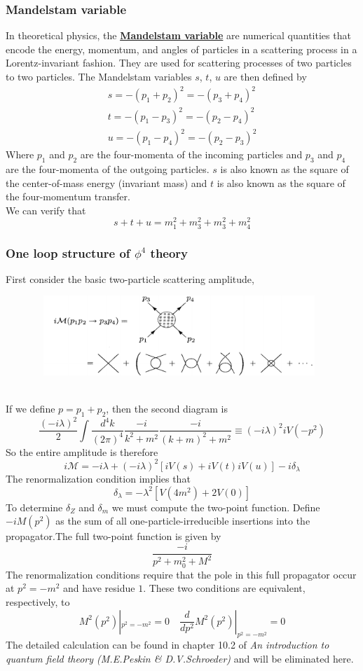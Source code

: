 \documentclass{article}
\begin{document}
\subsubsection{Mandelstam variable}
In theoretical physics, the \href{https://en.wikipedia.org/wiki/Mandelstam_variables}{\textbf{Mandelstam variable}}  are numerical quantities that encode the energy, momentum, and angles of particles in a scattering process in a Lorentz-invariant fashion. They are used for scattering processes of two particles to two particles. 
The Mandelstam variables $s$, $t$, $u$ are then defined by
\begin{eqnarray}
s=-(p_{1}+p_{2})^{2}=-(p_{3}+p_{4})^{2} \nonumber \\
t=-(p_{1}-p_{3})^{2}=-(p_{2}-p_{4})^{2} \nonumber \\
u=-(p_{1}-p_{4})^{2}=-(p_{2}-p_{3})^{2} \nonumber
\end{eqnarray}
Where $p_1$ and $p_2$ are the four-momenta of the incoming particles and $p_3$ and $p_4$ are the four-momenta of the outgoing particles.
$s$ is also known as the square of the center-of-mass energy (invariant mass) and $t$ is also known as the square of the four-momentum transfer.\\
We can verify that
\[s+t+u = m_1^2 + m_3^2 + m_3^2 +m_4^2\]

\subsubsection{One loop structure of $\phi^4$ theory}
First consider the basic two-particle scattering amplitude,
\begin{figure}[!h]
\centering
\includegraphics[height=3cm ,width=11cm]{./pic/RG4.png}
\caption*{}
\end{figure}\\
If we define $p = p_1 + p_2$, then the second diagram is
\[\frac{(-i\lambda)^2}{2} \int \frac{d^4k}{(2\pi)^4} \frac{-i}{k^2+m^2} \frac{-i}{(k+m)^2+m^2} \equiv (-i\lambda)^2 iV(-p^2)\]
So the entire amplitude is therefore
\[i\mathcal{M} = -i\lambda + (-i\lambda)^2 [iV(s) + iV(t) iV(u)] -i\delta_{\lambda}\]
The renormalization condition implies that
\[\delta_{\lambda} = -\lambda^2[V(4m^2)+2V(0)]\]
To determine $\delta_Z$ and $\delta_m$ we must compute the two-point function. Define $-iM(p^2)$ as the sum of all one-particle-irreducible insertions into the propagator.The full two-point function is given by
\[\frac{-i}{p^2 + m_0^2 + M^2}\]
The renormalization conditions require that the pole in this full propagator occur at $p^2=-m^2$ and have residue $1$. These two conditions are equivalent, respectively, to
\[M^2(p^2)|_{p^2=-m^2} = 0 \quad \frac{d}{dp^2} M^2(p^2)|_{p^2=-m^2} =0\]
The detailed calculation can be found in chapter 10.2 of \emph{An introduction to quantum field theory (M.E.Peskin \& D.V.Schroeder)} and will be eliminated here.
\end{document}
